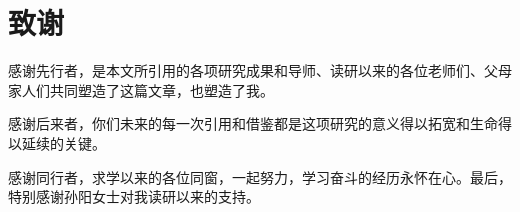\documentclass[12pt,a4paper]{article}
\numberwithin{equation}{section}    %
\begin{document}
\cleardoublepage

\section{致谢}
感谢先行者，是本文所引用的各项研究成果和导师、读研以来的各位老师们、父母家人们共同塑造了这篇文章，也塑造了我。

感谢后来者，你们未来的每一次引用和借鉴都是这项研究的意义得以拓宽和生命得以延续的关键。

感谢同行者，求学以来的各位同窗，一起努力，学习奋斗的经历永怀在心。最后，特别感谢孙阳女士对我读研以来的支持。

\cleardoublepage






\end{document}
